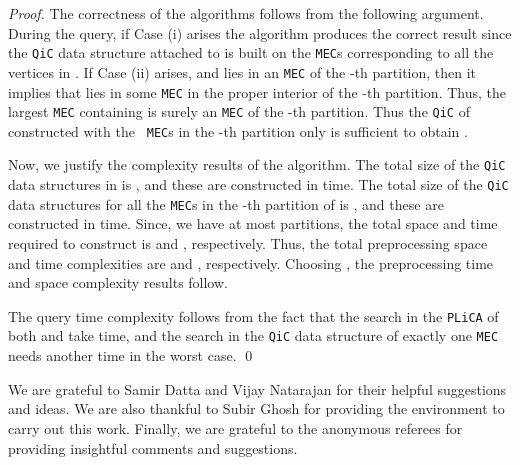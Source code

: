 \documentclass[12pt]{llncs}
\begin{document}
\begin{proof}
The correctness of the algorithms follows from the following argument. During the 
query, 
if Case (i) arises the algorithm produces the correct result since the {\tt QiC} data 
structure attached to  is built on the {\tt MEC}s corresponding to all 
the vertices in .  If Case (ii) arises, and  lies in an {\tt MEC}  of the -th 
partition, then it implies that  lies in some {\tt MEC} in the proper interior of the 
-th partition. Thus, the largest {\tt MEC} containing  is surely an {\tt MEC}  
of the -th partition. Thus the {\tt QiC} of  constructed with the {\tt 
MEC}s in the -th partition only is sufficient to obtain .      

Now, we justify the complexity results of the algorithm. The total size of the {\tt QiC} 
data structures in  is , and these are constructed in 
 time. The total size of the {\tt QiC} data structures for 
all the {\tt MEC}s in the -th partition of  is , and these are 
constructed 
in  time. Since, we have at most  partitions, the total 
space 
and time required to construct  is  and , respectively. Thus, 
the 
total preprocessing space and time complexities are  and 
, respectively. Choosing , the 
preprocessing 
time and space complexity results follow.

The query time complexity follows from the fact that the search in the {\tt PLiCA} of 
both 
 and  take  time, and the search in the {\tt QiC} data structure 
of 
exactly one {\tt MEC} needs another  time in the worst case. 
\qed
\end{proof}
 
 We are grateful to Samir Datta and
Vijay Natarajan for their helpful suggestions and ideas.
We are also thankful to Subir Ghosh for providing the environment to
carry out this work.  
Finally, we are grateful to the anonymous referees for providing insightful comments and suggestions.
\end{document}
